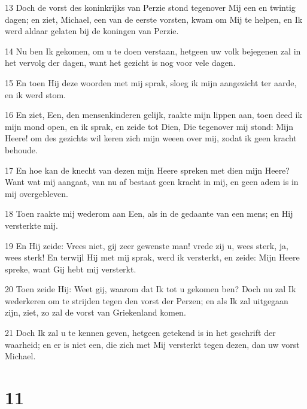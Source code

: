 \par 13 Doch de vorst des koninkrijks van Perzie stond tegenover Mij een en twintig dagen; en ziet, Michael, een van de eerste vorsten, kwam om Mij te helpen, en Ik werd aldaar gelaten bij de koningen van Perzie.
\par 14 Nu ben Ik gekomen, om u te doen verstaan, hetgeen uw volk bejegenen zal in het vervolg der dagen, want het gezicht is nog voor vele dagen.
\par 15 En toen Hij deze woorden met mij sprak, sloeg ik mijn aangezicht ter aarde, en ik werd stom.
\par 16 En ziet, Een, den mensenkinderen gelijk, raakte mijn lippen aan, toen deed ik mijn mond open, en ik sprak, en zeide tot Dien, Die tegenover mij stond: Mijn Heere! om des gezichts wil keren zich mijn weeen over mij, zodat ik geen kracht behoude.
\par 17 En hoe kan de knecht van dezen mijn Heere spreken met dien mijn Heere? Want wat mij aangaat, van nu af bestaat geen kracht in mij, en geen adem is in mij overgebleven.
\par 18 Toen raakte mij wederom aan Een, als in de gedaante van een mens; en Hij versterkte mij.
\par 19 En Hij zeide: Vrees niet, gij zeer gewenste man! vrede zij u, wees sterk, ja, wees sterk! En terwijl Hij met mij sprak, werd ik versterkt, en zeide: Mijn Heere spreke, want Gij hebt mij versterkt.
\par 20 Toen zeide Hij: Weet gij, waarom dat Ik tot u gekomen ben? Doch nu zal Ik wederkeren om te strijden tegen den vorst der Perzen; en als Ik zal uitgegaan zijn, ziet, zo zal de vorst van Griekenland komen.
\par 21 Doch Ik zal u te kennen geven, hetgeen getekend is in het geschrift der waarheid; en er is niet een, die zich met Mij versterkt tegen dezen, dan uw vorst Michael.

\chapter{11}

